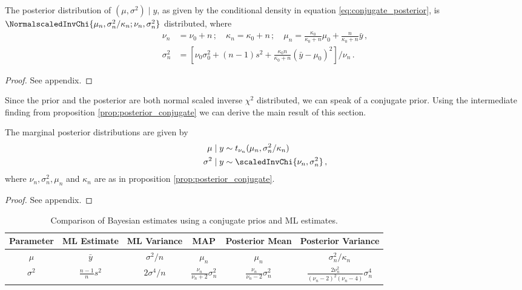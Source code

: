 \begin{proposition}
  The posterior distribution of $(\mu, \sigma^2) \mid y$, as given by the conditional density in equation \ref{eq:conjugate_posterior}, is $\NormalscaledInvChi{\mu_n, \sigma_n^2/\kappa_n; \nu_n, \sigma_n^2}$ distributed, where
  \begin{align*}
    \nu_n &= \nu_0 + n \,; \quad \kappa_n = \kappa_0 + n \,; \quad \mu_n =\frac{\kappa_0}{\kappa_0 + n}\mu_0 + \frac{n}{\kappa_0 + n}\bar{y} \,,\\
    \sigma_n^2 &= \left[\nu_0 \sigma_0^2 + (n-1)s^2 + \frac{\kappa_0 n}{\kappa_0 + n} (\bar{y} - \mu_0)^2\right] /\nu_n \,.
  \end{align*}
  \label{prop:posterior_conjugate}
\end{proposition}
\begin{proof}
  See appendix.
\end{proof}

Since the prior and the posterior are both normal scaled inverse $\chi^2$ distributed, we can speak of a conjugate prior.
Using the intermediate finding from proposition \ref{prop:posterior_conjugate} we can derive the main result of this section.

\begin{proposition}
  The marginal posterior distributions are given by
  \begin{align*}
    \mu \mid y &\sim t_{\nu_n}(\mu_n, \sigma_n^2 / \kappa_n)\\
    \sigma^2 \mid y &\sim \scaledInvChi{\nu_n, \sigma_n^2}\,,
  \end{align*}
  where $\nu_n, \sigma_n^2, \mu_n$ and $\kappa_n$ are as in proposition \ref{prop:posterior_conjugate}.
\end{proposition}
\begin{proof}
  See appendix.
\end{proof}

\begin{table}[ht]
\centering
\def\arraystretch{1.3}
{\small
 \begin{tabular}{c | c c c c c}
 Parameter & ML Estimate & ML Variance & MAP & Posterior Mean & Posterior Variance\\
 \hline
 $\mu$ & $\bar{y}$ & $\sigma^2 / n$ & $\mu_n$ & $\mu_n$ & $\sigma_n^2 / \kappa_n$\\
 $\sigma^2$ & $\frac{n-1}{n}s^2$ & $2 \sigma^4 / n$ & $\frac{\nu_n}{\nu_n + 2} \sigma_n^2$ & $\frac{\nu_n}{\nu_n - 2} \sigma_n^2$ & $\frac{2 \nu_n^2}{(\nu_n - 2)^2(\nu_n - 4)} \sigma_n^4$
 \end{tabular}
 }
\caption{{\small Comparison of Bayesian estimates using a conjugate prios and ML estimates.}}
\label{table:comp_conjugate_bay_ml}
\end{table}


